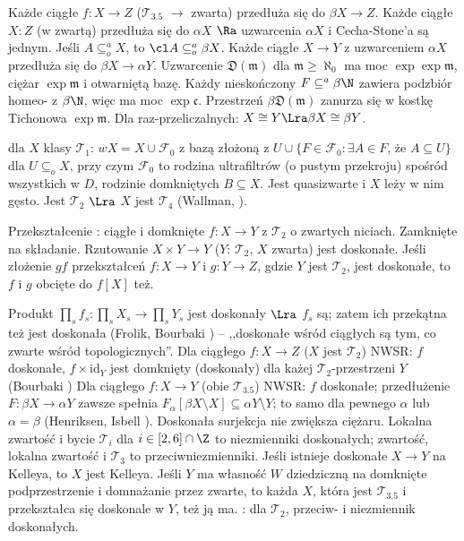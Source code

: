 Każde  ciągłe $f \colon X \to Z$ ($\mathcal T_{3.5}$ $\to$ zwarta) przedłuża się do $\beta X \to Z$.
Każde ciągłe $X \colon Z$ (w zwartą) przedłuża się do $\alpha X$ $\Ra$ uzwarcenia $\alpha X$ i Cecha-Stone'a są jednym.
Jeśli $A \subseteq_o^a X$, to $\cl A \subseteq_o^a \beta X$.
Każde ciągłe $X \to Y$ z uzwarceniem $\alpha X$ przedłuża się do $\beta X \to \alpha Y$.
Uzwarcenie $\mathfrak D(\mathfrak m)$ dla $\mathfrak m \ge \aleph_0$ ma moc $\exp \exp \mathfrak m$, ciężar $\exp \mathfrak m$ i otwarniętą bazę.
Każdy nieskończony $F \subseteq^a \beta \N$ zawiera podzbiór homeo- z $\beta \N$, więc ma moc $\exp \mathfrak c$.
Przestrzeń $\beta \mathfrak D(\mathfrak m)$ zanurza się w kostkę Tichonowa $\exp \mathfrak m$.
Dla raz-przeliczalnych: $X \cong Y \Lra \beta X \cong \beta Y$.

 dla $X$ klasy $\mathcal T_1$: $wX = X \cup \mathscr F_0$ z bazą złożoną z $U \cup \{F \in \mathscr F_0 : \exists A \in F\mbox{, że } A \subseteq U\}$ dla $U \subseteq_o X$, przy czym $\mathscr F_0$ to rodzina ultrafiltrów  (o pustym przekroju) spośród wszystkich w $D$, rodzinie domkniętych $B \subseteq X$.
Jest quasizwarte i $X$ leży w nim gęsto.
Jest $\mathcal T_2$ $\Lra$ $X$ jest $\mathcal T_4$ (Wallman, ).

Przekształcenie  : ciągłe i domknięte $f \colon X \to Y$ z $\mathcal T_2$ o zwartych niciach.
Zamknięte na składanie.
Rzutowanie $X \times Y \to Y$ ($Y$: $\mathcal T_2$, $X$ zwarta) jest doskonałe.
Jeśli złożenie $gf$ przekształceń $f \colon X \to Y$ i $g\colon  Y \to Z$, gdzie $Y$ jest $\mathcal T_2$, jest doskonałe, to $f$ i $g$ obcięte do $f[X]$ też.

Produkt $\prod_s f_s \colon \prod_s X_s \to \prod_s Y_s$ jest doskonały $\Lra$ $f_s$ są; zatem ich przekątna też jest doskonała (Frolik, Bourbaki ) -- ,,doskonałe wśród ciągłych są tym, co zwarte wśród topologicznych''.
Dla ciągłego $f \colon X \to Z$ ($X$ jest $\mathcal T_2$) NWSR: $f$ doskonałe, $f \times \textrm{id}_Y$ jest domknięty (doskonały) dla każej $\mathcal T_2$-przestrzeni $Y$ (Bourbaki )
Dla ciągłego $f \colon X \to Y$ (obie $\mathcal T_{3.5}$) NWSR: $f$ doskonałe; przedłużenie $F \colon \beta X \to \alpha Y$ zawsze spełnia $F_\alpha [\beta X \setminus X] \subseteq \alpha Y \setminus Y$; to samo dla pewnego $\alpha$ lub $\alpha = \beta$ (Henriksen, Isbell ).
Doskonała surjekcja nie zwiększa ciężaru.
Lokalna zwartość i bycie $\mathcal T_i$ dla $i \in [2, 6] \cap \Z$ to niezmienniki doskonałych; zwartość, lokalna zwartość i $\mathcal T_3$ to przeciwniezmienniki.
Jeśli istnieje doskonałe $X \to Y$ na Kelleya, to $X$ jest Kelleya.
Jeśli $Y$ ma własność $W$ dziedziczną na domknięte podprzestrzenie i domnażanie przez zwarte, to każda $X$, która jest $\mathcal T_{3.5}$ i przekształca się doskonale w $Y$, też ją ma.
: dla $\mathcal T_2$, przeciw- i niezmiennik doskonałych.

